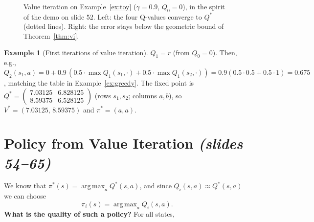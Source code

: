 \documentclass[11pt,a4paper]{article}
\newcommand{\norm}[1]{\lVert #1\rVert_\infty}
\DeclareMathOperator*{\argmax}{arg\,max}
\newcommand{\slides}[1]{\texorpdfstring{\emph{(slides #1)}}{(slides #1)}}
\theoremstyle{plain}
\theoremstyle{definition}
\newtheorem{example}{Example}\renewcommand{\theexample}{E\arabic{example}}
\theoremstyle{remark}
\begin{document}
\begin{figure}[htbp]
\begin{minipage}{0.49\linewidth}
\end{minipage}
\caption{Value iteration on Example~\ref{ex:toy} ($\gamma=0.9$, $Q_0=0$), in the spirit of the demo on slide 52. Left: the four Q-values converge to $Q^*$ (dotted lines). Right: the error stays below the geometric bound of Theorem~\ref{thm:vi}.}
\label{fig:vi}
\end{figure}

\begin{example}[First iterations of value iteration]\label{ex:vi}
$Q_1=r$ (from $Q_0=0$). Then, e.g., $Q_2(s_1,a)=0+0.9\,(0.5\cdot\max Q_1(s_1,\cdot)+0.5\cdot\max Q_1(s_2,\cdot))=0.9(0.5\cdot0.5+0.5\cdot1)=0.675$, matching the table in Example~\ref{ex:greedy}. The fixed point is $Q^*=\begin{pmatrix}7.03125&6.828125\\8.59375&6.528125\end{pmatrix}$ (rows $s_1,s_2$; columns $a,b$), so $V^*=(7.03125,\,8.59375)$ and $\pi^*=(a,a)$.
\end{example}

\section{Policy from Value Iteration \slides{54--65}}\label{sec:greedy}
We know that $\pi^*(s)=\argmax_aQ^*(s,a)$, and since $Q_i(s,a)\approx Q^*(s,a)$ we can choose
\[
\pi_i(s)=\argmax_aQ_i(s,a).
\]
\textbf{What is the quality of such a policy?} For all states,
\end{document}
